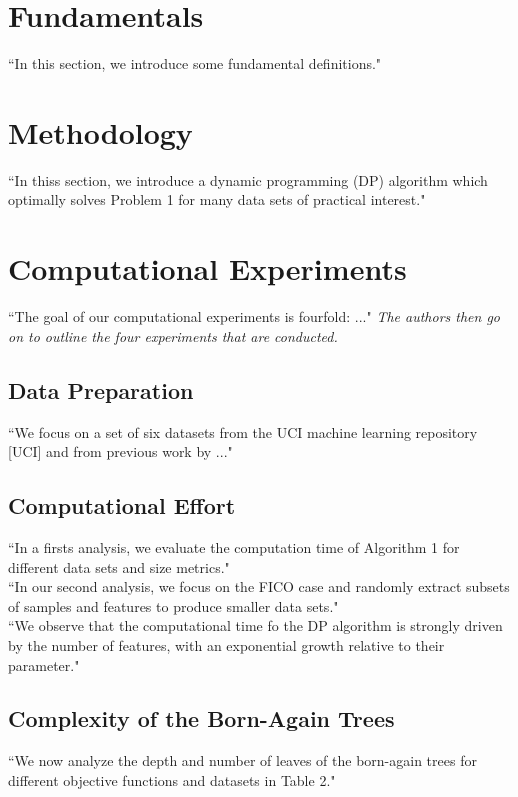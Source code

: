 \documentclass[11pt]{article}
\begin{document}

\section{Fundamentals}
``In this section, we introduce some fundamental definitions."


\section{Methodology}
``In thiss section, we introduce a dynamic programming (DP) algorithm which optimally solves Problem 1 for many data sets of practical interest."


\section{Computational Experiments}
``The goal of our computational experiments is fourfold: ..." \textit{The authors then go on to outline the four experiments that are conducted.}
\subsection{Data Preparation}
``We focus on a set of six datasets from the UCI machine learning repository [UCI] and from previous work by ..."
\subsection{Computational Effort}
``In a firsts analysis, we evaluate the computation time of Algorithm 1 for different data sets and size metrics."\\
``In our second analysis, we focus on the FICO case and randomly extract subsets of samples and features to produce smaller data sets."\\
``We observe that the computational time fo the DP algorithm is strongly driven by the number of features, with an exponential growth relative to their parameter."
\subsection{Complexity of the Born-Again Trees}
``We now analyze the depth and number of leaves of the born-again trees for different objective functions and datasets in Table 2."
\end{document}
